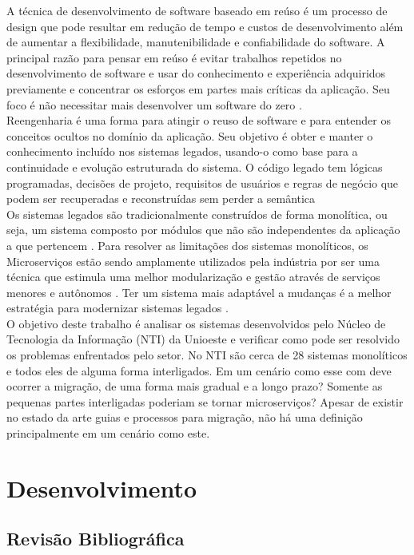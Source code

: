 \documentclass[12pt]{article}
\begin{document}
A técnica de desenvolvimento de software baseado em reúso é um processo de design que pode resultar em redução de tempo e custos de desenvolvimento além de aumentar a flexibilidade, manutenibilidade e confiabilidade do software. A principal razão para pensar em reúso é evitar trabalhos repetidos no desenvolvimento de software e usar do conhecimento e experiência adquiridos previamente e concentrar os esforços em partes mais críticas da aplicação. Seu foco é não necessitar mais desenvolver um software do zero \cite{Yang}.  
\\
Reengenharia é uma forma para atingir o reuso de software e para entender os conceitos ocultos no domínio da aplicação. Seu objetivo é obter e manter o conhecimento incluído nos sistemas legados, usando-o como base para a continuidade e evolução estruturada do sistema. O código legado tem lógicas programadas, decisões de projeto, requisitos de usuários e regras de negócio que podem ser recuperadas e reconstruídas sem perder a semântica \cite{Garcia2004a}
\\
Os sistemas legados são tradicionalmente construídos de forma monolítica, ou seja, um sistema composto por módulos que não são independentes da aplicação a que pertencem \cite{Dragoni}. Para resolver as limitações dos sistemas monolíticos, os Microserviços estão sendo amplamente utilizados pela indústria por ser uma técnica que estimula uma melhor modularização e gestão através de serviços menores e autônomos \cite{Carvalho}. Ter um sistema mais adaptável a mudanças é a melhor estratégia para modernizar sistemas legados \cite{Kamimura2019a}.
\\
O objetivo deste trabalho é analisar os sistemas desenvolvidos pelo Núcleo de Tecnologia da Informação (NTI) da Unioeste e verificar como pode ser resolvido os problemas enfrentados pelo setor. No NTI são cerca de 28 sistemas monolíticos e todos eles de alguma forma interligados. Em um cenário como esse com deve ocorrer a migração, de uma forma mais gradual e a longo prazo? Somente as pequenas partes interligadas poderiam se tornar microserviços? Apesar de existir no estado da arte guias e processos para migração, não há uma definição principalmente em um cenário como este.
 

\section{Desenvolvimento} \label{sec:firstpage}

\subsection{Revisão Bibliográfica}
\end{document}
